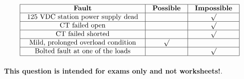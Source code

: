 






$$\vbox{\offinterlineskip
\halign{\strut
\vrule \quad\hfil # \ \hfil & 
\vrule \quad\hfil # \ \hfil & 
\vrule \quad\hfil # \ \hfil \vrule \cr
\noalign{\hrule}
%
{\bf Fault} & {\bf Possible} & {\bf Impossible} \cr
%
\noalign{\hrule}
%
125 VDC station power supply dead &  & $\surd$ \cr
%
\noalign{\hrule}
%
CT failed open &  & $\surd$ \cr
%
\noalign{\hrule}
%
CT failed shorted &  & $\surd$ \cr
%
\noalign{\hrule}
%
Mild, prolonged overload condition & $\surd$ &  \cr
%
\noalign{\hrule}
%
Bolted fault at one of the loads &  & $\surd$ \cr
%
\noalign{\hrule}
} %
}$$ %







{\bf This question is intended for exams only and not worksheets!}.




